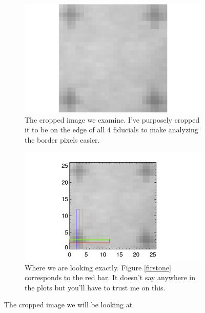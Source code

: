 \documentclass[10pt]{article}
\begin{document}
\begin{figure}[!h]
    \centering 
    \begin{subfigure}[b]{.45\linewidth}
        \centering
        \includegraphics[width=1.3\textwidth]{plots_tables_images/datcrop.png}
        \caption{The cropped image we examine. I've purposely cropped it to be on the edge of all 4 fiducials to make analyzing the border pixels easier. }
    \end{subfigure}
    \hspace{.5in}
    \begin{subfigure}[b]{.45\linewidth}
        \centering
        \includegraphics[width=1.5\textwidth]{plots_tables_images/datcrop_color.png}
        \caption{Where we are looking exactly. Figure \ref{firstone} corresponds to the red bar. It doesn't say anywhere in the plots but you'll have to trust me on this.}
    \end{subfigure}
    \caption{The cropped image we will be looking at}
    \label{datcrop}
\end{figure}
\end{document}
